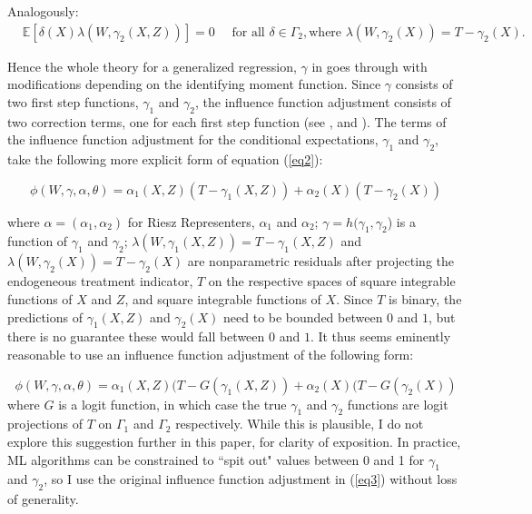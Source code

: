 Analogously:
\begin{align*}
&\mathbb{E}[\delta(X) \lambda(W, \gamma_2(X,Z))]=0 \quad \text { for all } \delta \in \Gamma_2, \text{where } \lambda(W, \gamma_2(X))=T - \gamma_2 (X).
\end{align*}

Hence the whole theory for a generalized regression, $\gamma$ in \citet{chernozhukov2022locally} goes through with modifications depending on the identifying moment function. Since $\gamma$ consists of two first step functions, $\gamma_1$ and $\gamma_2$, the influence function adjustment consists of two correction terms, one for each first step function (see \citet{ichimura2022influence}, \citet{chernozhukov2022locally} and \citet{newey1994asymptotic}). The terms of the influence function adjustment for the conditional expectations, $\gamma_1$ and $\gamma_2$, take the following more explicit form of equation (\ref{eq2}):

\begin{equation} \label{eq3}
\phi(W, \gamma, \alpha, \theta)=\alpha_1(X,Z)(T-\gamma_1(X,Z))+\alpha_2(X)(T-\gamma_2(X))    
\end{equation}

where $\alpha=(\alpha_1,\alpha_2)$ for Riesz Representers, $\alpha_1$ and $\alpha_2$; $\gamma=h(\gamma_1,\gamma_2$) is a function of $\gamma_1$ and $\gamma_2$; $\lambda(W,\gamma_1(X,Z))=T-\gamma_1(X,Z)$ and $\lambda(W,\gamma_2(X))=T-\gamma_2(X)$ are nonparametric residuals after projecting the endogeneous treatment indicator, $T$ on the respective spaces of square integrable functions of $X$ and $Z$, and square integrable functions of $X$. Since $T$ is binary, the predictions of $\gamma_1(X,Z)$ and $\gamma_2(X)$ need to be bounded between $0$ and $1$, but there is no guarantee these would fall between $0$ and $1$. It thus seems eminently reasonable to use an influence function adjustment of the following form:

\[\phi(W, \gamma, \alpha, \theta)=\alpha_1(X,Z)(T-G(\gamma_1(X,Z))+\alpha_2(X)(T-G(\gamma_2(X))\]
where $G$ is a logit function, in which case the true $\gamma_1$ and $\gamma_2$ functions are logit projections of $T$ on $\Gamma_1$ and $\Gamma_2$ respectively. While this is plausible, I do not explore this suggestion further in this paper, for clarity of exposition. In practice, ML algorithms can be constrained to ``spit out" values between 0 and 1 for $\gamma_1$ and $\gamma_2$, so I use the original influence function adjustment in (\ref{eq3}) without loss of generality. 

